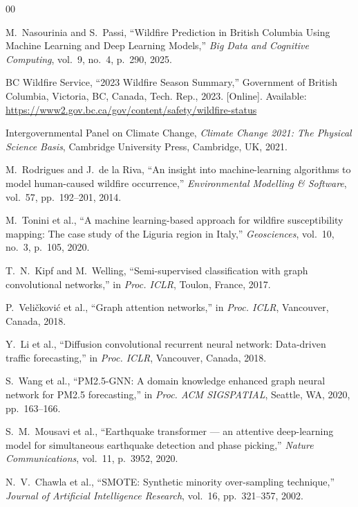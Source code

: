 \documentclass[conference]{IEEEtran}
\begin{document}
\begin{thebibliography}{00}

M.~Nasourinia and S.~Passi,
``Wildfire Prediction in British Columbia Using Machine Learning and
Deep Learning Models,''
\textit{Big Data and Cognitive Computing}, vol.~9, no.~4, p.~290, 2025.

BC Wildfire Service, ``2023 Wildfire Season Summary,''
Government of British Columbia, Victoria, BC, Canada, Tech. Rep., 2023.
[Online]. Available: \url{https://www2.gov.bc.ca/gov/content/safety/wildfire-status}

Intergovernmental Panel on Climate Change,
\textit{Climate Change 2021: The Physical Science Basis},
Cambridge University Press, Cambridge, UK, 2021.

M.~Rodrigues and J.~de la Riva,
``An insight into machine-learning algorithms to model human-caused
wildfire occurrence,''
\textit{Environmental Modelling \& Software}, vol.~57, pp.~192--201, 2014.

M.~Tonini et al.,
``A machine learning-based approach for wildfire susceptibility
mapping: The case study of the Liguria region in Italy,''
\textit{Geosciences}, vol.~10, no.~3, p.~105, 2020.

T.~N.~Kipf and M.~Welling,
``Semi-supervised classification with graph convolutional networks,''
in \textit{Proc. ICLR}, Toulon, France, 2017.

P.~Veli\v{c}kovi\'{c} et al.,
``Graph attention networks,''
in \textit{Proc. ICLR}, Vancouver, Canada, 2018.

Y.~Li et al.,
``Diffusion convolutional recurrent neural network: Data-driven
traffic forecasting,''
in \textit{Proc. ICLR}, Vancouver, Canada, 2018.

S.~Wang et al.,
``PM2.5-GNN: A domain knowledge enhanced graph neural network for
PM2.5 forecasting,''
in \textit{Proc. ACM SIGSPATIAL}, Seattle, WA, 2020, pp.~163--166.

S.~M.~Mousavi et al.,
``Earthquake transformer — an attentive deep-learning model for
simultaneous earthquake detection and phase picking,''
\textit{Nature Communications}, vol.~11, p.~3952, 2020.

N.~V.~Chawla et al.,
``SMOTE: Synthetic minority over-sampling technique,''
\textit{Journal of Artificial Intelligence Research},
vol.~16, pp.~321--357, 2002.


\end{thebibliography}
\end{document}
